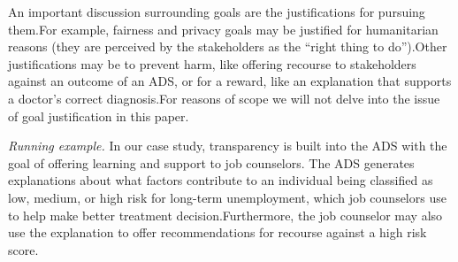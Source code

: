 An important discussion surrounding goals are the justifications for pursuing them.For example, fairness and privacy goals may be justified for humanitarian reasons (they are perceived by the stakeholders as the ``right thing to do'').Other justifications may be to prevent harm, like offering recourse to stakeholders against an outcome of an ADS, or for a reward, like an explanation that supports a doctor's correct diagnosis.For reasons of scope we will not delve into the issue of goal justification in this paper.

\emph{Running example.} In our case study, transparency is built into the ADS with the goal of offering learning and support to job counselors. The ADS generates explanations about what factors contribute to an individual being classified as low, medium, or high risk for long-term unemployment, which job counselors use to help make better treatment decision.Furthermore, the job counselor may also use the explanation to offer recommendations for recourse against a high risk score.


